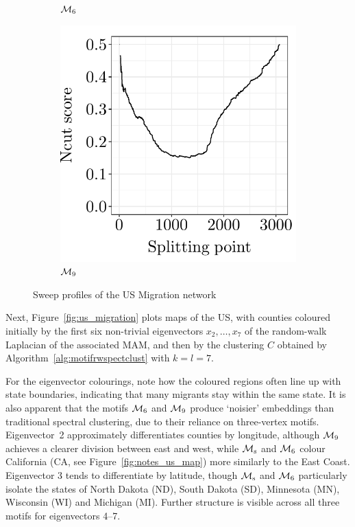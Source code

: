 \begin{figure}[H]
\begin{subfigure}{.325\textwidth}
		\caption{$\mathcal{M}_6$}
	\end{subfigure}
	\begin{subfigure}{.325\textwidth}
		\centering
		\includegraphics[scale=0.4,draft=false]{../../results/us_migration/us_migration_sweep_profile_M9.pdf}
		\caption{$\mathcal{M}_9$}
	\end{subfigure}
	\caption{Sweep profiles of the US Migration network}
	\label{fig:migration_sweep}
\end{figure}




Next, Figure~\ref{fig:us_migration} plots maps of the US, with counties coloured initially by the first six non-trivial eigenvectors $x_2, \ldots, x_7$ of the random-walk Laplacian of the associated MAM, and then by the clustering $C$ obtained by Algorithm~\ref{alg:motifrwspectclust} with $k=l=7$.

For the eigenvector colourings, note how the coloured regions often line up with state boundaries, indicating that many migrants stay within the same state.
It is also apparent that the motifs $\mathcal{M}_6$ and $\mathcal{M}_9$ produce `noisier' embeddings than traditional spectral clustering, due to their reliance on three-vertex motifs.
Eigenvector~2 approximately differentiates counties by longitude, although $\mathcal{M}_9$ achieves a clearer division between east and west, while $\mathcal{M}_\mathrm{s}$ and $\mathcal{M}_6$ colour California (CA, see Figure~\ref{fig:notes_us_map}) more similarly to the East Coast.
Eigenvector 3 tends to differentiate by latitude, though $\mathcal{M}_\mathrm{s}$ and $\mathcal{M}_6$ particularly isolate the states of North Dakota (ND), South Dakota (SD), Minnesota (MN), Wisconsin (WI) and Michigan (MI).
Further structure is visible across all three motifs for eigenvectors 4--7.

